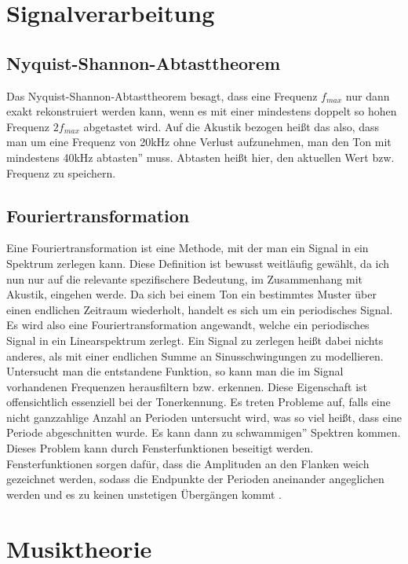 \section{Signalverarbeitung}
\subsection*{Nyquist-Shannon-Abtasttheorem}
\label{sec:Abtast}
Das Nyquist-Shannon-Abtasttheorem besagt, dass eine Frequenz $f_{max}$ nur dann exakt rekonstruiert werden kann, wenn es mit einer mindestens doppelt so hohen Frequenz $2f_{max}$ abgetastet wird. Auf die Akustik bezogen heißt das also, dass man um eine Frequenz von 20kHz ohne Verlust aufzunehmen, 
man den Ton mit mindestens 40kHz \glqq abtasten'' muss. Abtasten heißt hier, den aktuellen Wert bzw. Frequenz zu speichern. 

\subsection*{Fouriertransformation}
\label{sec:Fouriertransformation}
Eine Fouriertransformation ist eine Methode, mit der man ein Signal in ein Spektrum zerlegen kann. Diese Definition ist bewusst weitläufig gewählt, da ich nun nur auf die relevante spezifischere Bedeutung, im Zusammenhang mit Akustik, eingehen werde.
Da sich bei einem Ton ein bestimmtes Muster über einen endlichen Zeitraum wiederholt, handelt es sich um ein periodisches Signal. Es wird also eine Fouriertransformation angewandt, welche ein
periodisches Signal in ein Linearspektrum zerlegt. Ein Signal zu zerlegen heißt dabei nichts anderes, als mit einer endlichen Summe an Sinusschwingungen zu modellieren. Untersucht man die entstandene Funktion, so kann man die im Signal vorhandenen Frequenzen 
herausfiltern bzw. erkennen. Diese Eigenschaft ist offensichtlich essenziell bei der Tonerkennung. Es treten Probleme auf, falls eine nicht ganzzahlige Anzahl an Perioden untersucht wird, was so viel heißt, dass eine Periode abgeschnitten wurde. Es kann dann zu \glqq schwammigen'' Spektren kommen.
Dieses Problem kann durch Fensterfunktionen beseitigt werden. Fensterfunktionen sorgen dafür, dass die Amplituden an den Flanken weich gezeichnet werden, sodass die Endpunkte der Perioden aneinander angeglichen werden und es zu keinen unstetigen Übergängen kommt \cite{Butz2006}.

\section{Musiktheorie}
